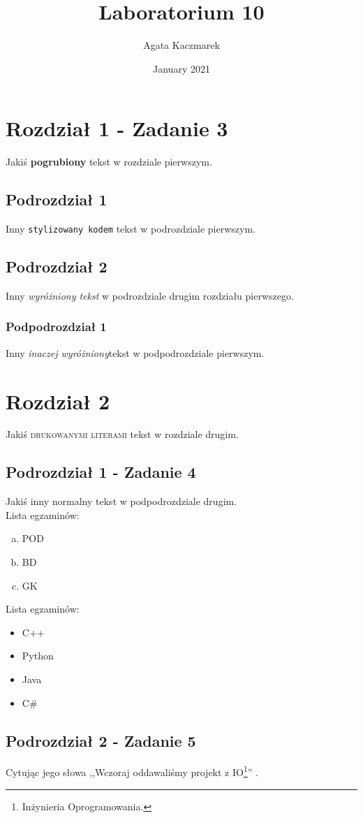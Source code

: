 \documentclass{article}
\title{Laboratorium 10}
\author{Agata Kaczmarek}
\date{January 2021}
\begin{document}
\maketitle 
\newpage
\tableofcontents
\newpage


\section{Rozdział 1 - Zadanie 3}
Jakiś \textbf{pogrubiony} tekst w rozdziale pierwszym.
\subsection{Podrozdział 1}
Inny \texttt{stylizowany kodem} tekst w podrozdziale pierwszym.
\subsection{Podrozdział 2}
Inny \emph{wyróżniony tekst} w podrozdziale drugim rozdziału pierwszego.
\subsubsection{Podpodrozdział 1}
Inny \textit{inaczej wyróżniony}tekst  w podpodrozdziale pierwszym.
\section{Rozdział 2}
Jakiś \textsc{drukowanymi literami} tekst w rozdziale drugim.

\subsection{Podrozdział 1 - Zadanie 4}
Jakiś inny \textnormal{normalny} tekst w podpodrozdziale drugim. \\
Lista egzaminów: 
\begin{enumerate}[a)]
    \item POD
    \item BD
    \item GK
\end{enumerate}
Lista egzaminów: 
\begin{itemize}
    \item C++
    \item Python
    \item Java
    \item C\#
\end{itemize}
\subsection{Podrozdział 2 - Zadanie 5}
Cytując jego słowa ,,Wczoraj oddawaliśmy projekt z IO\footnote{Inżynieria Oprogramowania.}'' .
\end{document}
